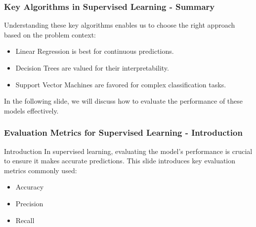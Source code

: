 \documentclass{beamer}
\begin{document}
\begin{frame}[fragile]
    \frametitle{Key Algorithms in Supervised Learning - Summary}
    Understanding these key algorithms enables us to choose the right approach based on the problem context:
    \begin{itemize}
        \item Linear Regression is best for continuous predictions.
        \item Decision Trees are valued for their interpretability.
        \item Support Vector Machines are favored for complex classification tasks.
    \end{itemize}
    In the following slide, we will discuss how to evaluate the performance of these models effectively.
\end{frame}

\begin{frame}[fragile]
    \frametitle{Evaluation Metrics for Supervised Learning - Introduction}
    \begin{block}{Introduction}
        In supervised learning, evaluating the model's performance is crucial to ensure it makes accurate predictions. 
        This slide introduces key evaluation metrics commonly used:
        \begin{itemize}
            \item Accuracy
            \item Precision
            \item Recall
        \end{itemize}
    \end{block}
\end{frame}
\end{document}
